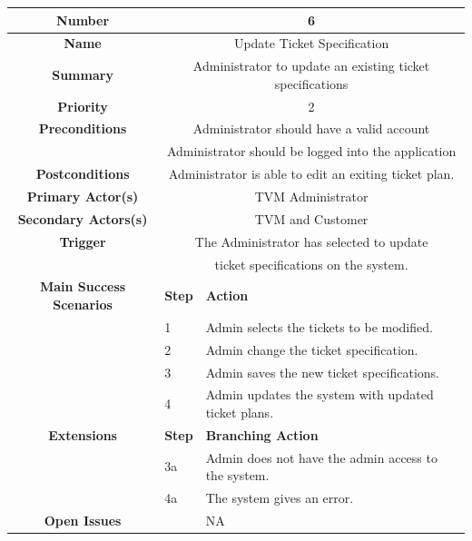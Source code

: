 \documentclass[a4paper,12pt]{report}
\begin{document}
\begin{tabular}{ | c | p{2cm} | p{7cm} |}
	
	\hline
	\textbf{Number} & \multicolumn{2}{c|}{6}  \\
	\hline
	\textbf{Name} & \multicolumn{2}{c|}{Update Ticket Specification}  \\
	\hline
	\textbf{Summary} & \multicolumn{2}{c|}{Administrator to update an existing ticket specifications}  \\
	\hline
	\textbf{Priority} & \multicolumn{2}{c|}{2}  \\
	\hline
	\textbf{Preconditions} & \multicolumn{2}{c|}{Administrator should have a valid account}  \\
			  &  \multicolumn{2	}{c|}{Administrator should be logged into the application} \\
	\hline
	\textbf{Postconditions} & \multicolumn{2}{c|}{Administrator is able to edit an exiting ticket plan.}  \\
	\hline
	\textbf{Primary Actor(s)} & \multicolumn{2}{c|}{TVM Administrator}  \\
	\hline
	\textbf{Secondary Actors(s)} & \multicolumn{2}{c|}{TVM and Customer}  \\
	\hline
	\textbf{Trigger} & \multicolumn{2}{c|}{The Administrator has selected to update}  \\
     	&  \multicolumn{2}{c|}{ ticket specifications on the system.} \\
	\hline
	\textbf{Main Success Scenarios} & \textbf{Step} & \textbf{Action} \\
	\hline
	& 1 & Admin selects the tickets to be modified. \\ 
	\hline
	&  2  & Admin change the ticket specification. \\
	\hline
	&  3  & Admin saves the new ticket specifications. \\
	\hline
	&  4  & Admin updates the system with updated ticket plans. \\
	\hline
	
	\textbf{Extensions} & \textbf{Step} & \textbf{Branching Action} \\
	\hline
	&  3a  & Admin does not have the admin access to the system.  \\
	\hline
	&  4a  &  The system gives an error. \\
	\hline
	\textbf{Open Issues} &    & NA \\
	\hline
	
\end{tabular}
\end{document}
